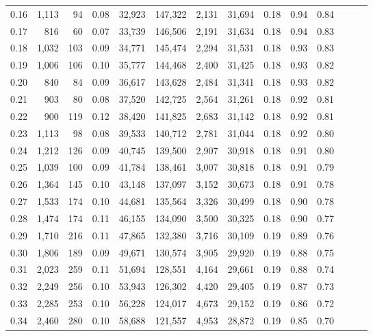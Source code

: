 \begin{tabular}{rrrrrrrrrrrrrr}
0.16 &  1,113 &   94 &  0.08 &   32,923 &  147,322 &   2,131 &  31,694 &  0.18 &  0.94 &      0.84 \\
0.17 &    816 &   60 &  0.07 &   33,739 &  146,506 &   2,191 &  31,634 &  0.18 &  0.94 &      0.83 \\
0.18 &  1,032 &  103 &  0.09 &   34,771 &  145,474 &   2,294 &  31,531 &  0.18 &  0.93 &      0.83 \\
0.19 &  1,006 &  106 &  0.10 &   35,777 &  144,468 &   2,400 &  31,425 &  0.18 &  0.93 &      0.82 \\
0.20 &    840 &   84 &  0.09 &   36,617 &  143,628 &   2,484 &  31,341 &  0.18 &  0.93 &      0.82 \\
0.21 &    903 &   80 &  0.08 &   37,520 &  142,725 &   2,564 &  31,261 &  0.18 &  0.92 &      0.81 \\
0.22 &    900 &  119 &  0.12 &   38,420 &  141,825 &   2,683 &  31,142 &  0.18 &  0.92 &      0.81 \\
0.23 &  1,113 &   98 &  0.08 &   39,533 &  140,712 &   2,781 &  31,044 &  0.18 &  0.92 &      0.80 \\
0.24 &  1,212 &  126 &  0.09 &   40,745 &  139,500 &   2,907 &  30,918 &  0.18 &  0.91 &      0.80 \\
0.25 &  1,039 &  100 &  0.09 &   41,784 &  138,461 &   3,007 &  30,818 &  0.18 &  0.91 &      0.79 \\
0.26 &  1,364 &  145 &  0.10 &   43,148 &  137,097 &   3,152 &  30,673 &  0.18 &  0.91 &      0.78 \\
0.27 &  1,533 &  174 &  0.10 &   44,681 &  135,564 &   3,326 &  30,499 &  0.18 &  0.90 &      0.78 \\
0.28 &  1,474 &  174 &  0.11 &   46,155 &  134,090 &   3,500 &  30,325 &  0.18 &  0.90 &      0.77 \\
0.29 &  1,710 &  216 &  0.11 &   47,865 &  132,380 &   3,716 &  30,109 &  0.19 &  0.89 &      0.76 \\
0.30 &  1,806 &  189 &  0.09 &   49,671 &  130,574 &   3,905 &  29,920 &  0.19 &  0.88 &      0.75 \\
0.31 &  2,023 &  259 &  0.11 &   51,694 &  128,551 &   4,164 &  29,661 &  0.19 &  0.88 &      0.74 \\
0.32 &  2,249 &  256 &  0.10 &   53,943 &  126,302 &   4,420 &  29,405 &  0.19 &  0.87 &      0.73 \\
0.33 &  2,285 &  253 &  0.10 &   56,228 &  124,017 &   4,673 &  29,152 &  0.19 &  0.86 &      0.72 \\
0.34 &  2,460 &  280 &  0.10 &   58,688 &  121,557 &   4,953 &  28,872 &  0.19 &  0.85 &      0.70 \\

\end{tabular}
